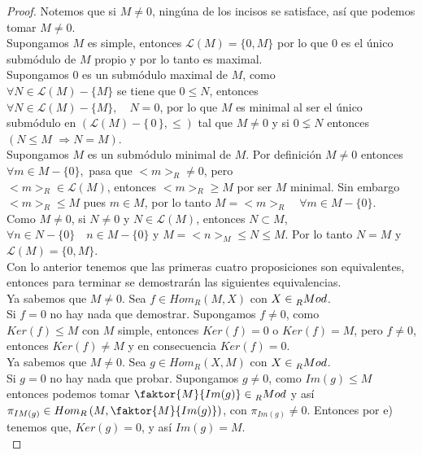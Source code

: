 \documentclass{article}
\newcommand{\La}{\mathscr{L}}
\theoremstyle{definition}
\theoremstyle{plain}
\theoremstyle{plain}
\theoremstyle{definition}
\theoremstyle{definition}
\theoremstyle{definition}
\theoremstyle{definition}
\theoremstyle{definition}
\theoremstyle{definition}
\begin{document}
\begin{enumerate}[label=\textbf{Ej \arabic*.}]
 \begin{proof}
Notemos que si $M\neq 0$, ningúna de los incisos se satisface, así que podemos tomar $M\neq 0$.\\

  Supongamos $M$ es simple, entonces $\La(M)=\{0,M\}$ por lo que $0$ es el único
 submódulo de $M$ propio y por lo tanto es maximal.\\

  Supongamos $0$ es un submódulo maximal de $M$, como \\ $\forall N\in \La(M)-\{M\}$ se tiene 
 que $0\leq  N$, entonces \\ $\forall N\in\La(M)-\{M\},\quad N=0$, por lo que $M$ es minimal al ser el único submódulo en 
 $\left(\La(M)-\{\,0\,\},\leq \right)$ tal que $M\neq 0$ y si $0\lneq N$ entonces \quad $\left(N\leq M\,\,\Rightarrow N=M\right)$.\\
 
 Supongamos $M$ es un submódulo minimal de $M$. Por definición $M\neq 0$ entonces 
 $\forall m\in M-\{0\},$ pasa que $<m>_R\neq 0$, pero \\
 $<m>_R\in \La(M)$, entonces $<m>_R\geq M$ por ser $M$ minimal.
 Sin embargo $<m>_R\leq M$ pues $m\in M$, por lo tanto $M=<m>_R\quad \forall m\in M-\{0\}$.\\
 
  Como $M\neq 0$, si $N\neq 0$ y $N\in \La(M)$, entonces $N\subset M$,
  $\forall n\in N-\{0\}\quad n\in M-\{0\}$ y $M=<n>_M\leq N\leq M$. Por lo tanto $N=M$ y $\La(M)=\{0,M\}$.\\
  
 Con lo anterior tenemos que las primeras cuatro proposiciones son equivalentes, entonces para terminar se demostrarán 
 las siguientes equivalencias.\\
 
  Ya sabemos que $M\neq 0$. Sea $f\in Hom_R(M,X)$ con $X\in \prescript{}{R}{Mod}$.\\
 Si $f=0$ no hay nada que demostrar. Supongamos $f\neq 0$, como \\
 $Ker(f)\leq M$ con $M$ simple, entonces 
 $Ker(f)=0$ o $Ker(f)=M$, pero $f\neq 0$, entonces $Ker(f)\neq M$ y en consecuencia $Ker(f)=0$.\\
 
  Ya sabemos que $M\neq 0$. Sea $g\in Hom_R(X,M)$ con $X\in \prescript{}{R}{Mod}$.\\
 Si $g=0$ no hay nada que probar. Supongamos $g\neq 0$, como $Im(g)\leq M$ entonces podemos tomar 
 $\faktor{M}{Im(g)} \in \prescript{}{R}{Mod}$ y así \\
 $\pi_{IM(g)}\in Hom_R\left(M,\faktor{M}{Im(g)}\right)$, con $\pi_{Im(g)}\neq 0 $. Entonces por e) tenemos  que, $Ker(g)=0$, y así $Im(g)=M$.\\
 

\end{proof}
\end{enumerate}
\end{document}
